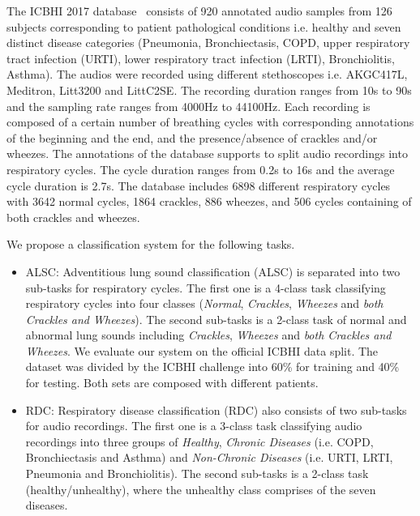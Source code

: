 \documentclass[journal]{IEEEtran}
\begin{document}
The ICBHI 2017 database~\cite{rocha2018alpha} consists of 920 annotated audio samples from 126 subjects corresponding to patient pathological conditions i.e. healthy and seven distinct disease categories (Pneumonia, Bronchiectasis, COPD, upper respiratory tract infection (URTI), lower respiratory tract infection (LRTI), Bronchiolitis, Asthma). The audios were recorded using different stethoscopes i.e. AKGC417L, Meditron, Litt3200 and LittC2SE. The recording duration ranges from 10s to 90s and the sampling rate ranges from 4000Hz to 44100Hz. Each recording is composed of a certain number of breathing cycles with corresponding annotations of the beginning and the end, and the presence/absence of crackles and/or wheezes. The annotations of the database supports to split audio recordings into respiratory cycles. The cycle duration ranges from 0.2s to 16s and the average cycle duration is 2.7s. The database includes 6898 different respiratory cycles with 3642 normal cycles, 1864 crackles, 886 wheezes, and 506 cycles containing of both crackles and wheezes.

We propose a classification system for the following tasks.
\begin{itemize}
   	\item ALSC: Adventitious lung sound classification (ALSC) is separated into two sub-tasks for respiratory cycles. The first one is a 4-class task classifying respiratory cycles into four classes (\textit{Normal}, \textit{Crackles}, \textit{Wheezes} and \textit{both Crackles and Wheezes}). The second sub-tasks is a 2-class task of normal and abnormal lung sounds including \textit{Crackles}, \textit{Wheezes} and \textit{both Crackles and Wheezes}. We evaluate our system on the official ICBHI data split. The dataset was divided by the ICBHI challenge into 60\% for training and 40\% for testing. Both sets are composed with different patients.
	 \item RDC: Respiratory disease classification (RDC) also consists of two sub-tasks for audio  recordings. The first one is a 3-class task classifying audio recordings into three groups of \textit{Healthy}, \textit{Chronic Diseases} (i.e. COPD, Bronchiectasis and Asthma) and \textit{Non-Chronic Diseases} (i.e. URTI, LRTI, Pneumonia and Bronchiolitis). The second sub-tasks is a 2-class task (healthy/unhealthy), where the unhealthy class comprises of the seven diseases.
\end{itemize}
\end{document}
